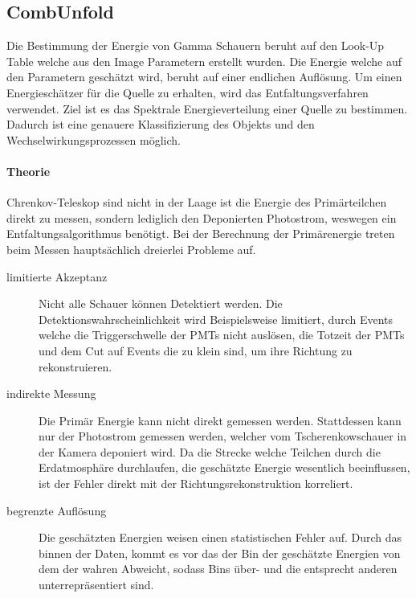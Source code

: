 \subsection{CombUnfold}%
\label{sub:combunfold}
Die Bestimmung der Energie von Gamma Schauern beruht auf den Look-Up Table
welche aus den Image Parametern erstellt wurden. 
Die Energie welche auf den Parametern geschätzt wird, beruht auf einer 
endlichen Auflösung.
Um einen Energieschätzer für die Quelle zu erhalten, 
wird das Entfaltungsverfahren verwendet.
Ziel ist es das Spektrale Energieverteilung einer Quelle zu bestimmen.
Dadurch ist eine genauere Klassifizierung des Objekts und den
Wechselwirkungsprozessen möglich. 

\paragraph{Theorie}%
\label{par:theorie}
Chrenkov-Teleskop sind nicht in der Laage ist die Energie 
des Primärteilchen direkt zu messen,
sondern lediglich den Deponierten Photostrom,
weswegen ein Entfaltungsalgorithmus benötigt.
Bei der Berechnung der Primärenergie treten beim Messen hauptsächlich dreierlei Probleme auf.

\begin{description}
    \item[\quad limitierte Akzeptanz]
        Nicht alle Schauer können Detektiert werden. 
        Die Detektionswahrscheinlichkeit wird Beispielsweise limitiert,
        durch Events welche die Triggerschwelle der PMTs nicht auslösen,
        die Totzeit der PMTs 
        und dem Cut auf Events die zu klein sind,
        um ihre Richtung zu rekonstruieren.

    \item[\quad indirekte Messung]
        Die Primär Energie kann nicht direkt gemessen werden.
        Stattdessen kann nur der Photostrom gemessen werden,
        welcher vom Tscherenkowschauer in der Kamera deponiert wird.
        Da die Strecke welche Teilchen durch die Erdatmosphäre 
        durchlaufen,
        die geschätzte Energie wesentlich beeinflussen,
        ist der Fehler direkt mit der Richtungsrekonstruktion korreliert.

    \item[\quad begrenzte Auflösung] 
        Die geschätzten Energien weisen einen statistischen Fehler auf. 
        Durch das binnen der Daten, 
        kommt es vor das der Bin der geschätzte Energien von dem der wahren
        Abweicht,
        sodass Bins über- und die entsprecht anderen unterrepräsentiert sind.
\end{description}

